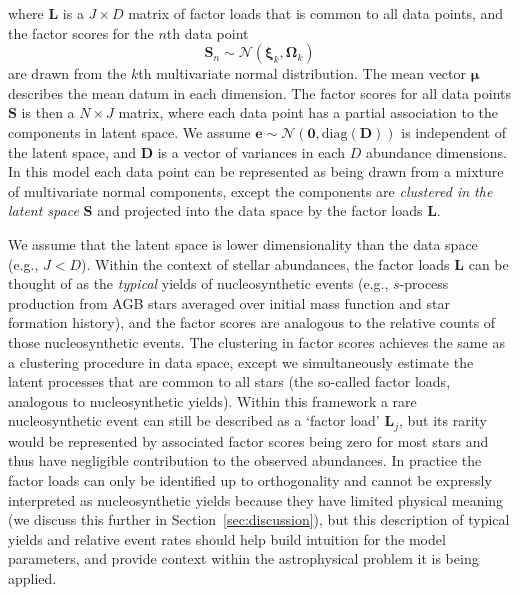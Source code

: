 \documentclass[twocolumn]{aastex62}
\newcommand{\vect}[1]{\boldsymbol{\mathbf{#1}}}
\renewcommand{\vec}[1]{\vect{#1}}
\newcommand{\factorloads}{\textbf{L}}
\newcommand{\factorscores}{\textbf{S}}
\newcommand{\specificvariance}{\vec{D}}
\newcommand{\NumData}{N}
\newcommand{\NumDimensions}{D}
\newcommand{\numdata}{n}
\newcommand{\NumLatentFactors}{J}
\newcommand{\numlatentfactors}{j}
\newcommand{\numcomponents}{k}
\begin{document}
\noindent{}where $\factorloads$ is a $\NumLatentFactors \times \NumDimensions$ 
matrix of factor loads that is common to all data points, and the factor scores 
for the $\numdata$th data point
\begin{equation}
	\factorscores_\numdata \sim \mathcal{N}(\vec\xi_\numcomponents, \vec\Omega_\numcomponents)
\end{equation}
\noindent{}are drawn from the $\numcomponents$th multivariate normal distribution.
The mean vector $\vec\mu$ describes the mean datum in each dimension.
The factor scores for all data points $\factorscores$ is then a 
$\NumData \times \NumLatentFactors$ matrix, where each data point has a partial
association to the components in latent space. 
We assume $\vec{e} \sim \mathcal{N}\left(\vec{0}, \textrm{diag}(\specificvariance)\right)$
is independent of the latent space, and $\specificvariance$ is a
vector of variances in each $\NumDimensions$ abundance dimensions.
In this model each data point can be represented as being drawn
from a mixture of multivariate normal components, except the components
are \emph{clustered in the latent space} $\factorscores$ and projected
into the data space by the factor loads $\factorloads$. 


We assume that the latent space is lower dimensionality than the
data space (e.g., $\NumLatentFactors < \NumDimensions$).
Within the context of stellar abundances, the factor loads
$\factorloads$ can be thought of as the \emph{typical} yields
of nucleosynthetic
events (e.g., $s$-process production from AGB stars averaged over
initial mass function and star formation history), and the
factor scores are analogous to the relative counts of those 
nucleosynthetic events. The clustering in factor scores
achieves the same as a clustering procedure in data space,
except we simultaneously estimate the latent processes that are
common to all stars (the so-called factor loads, analogous to 
nucleosynthetic yields). Within this framework a rare nucleosynthetic event
can still be described as a `factor load' $\factorloads_\numlatentfactors$, 
but its rarity would be represented by associated factor
scores being zero for most stars and thus have negligible contribution
to the observed abundances. In practice the factor loads can only be 
identified up to orthogonality and cannot be expressly interpreted as
nucleosynthetic yields because they have limited physical meaning
(we discuss this further in Section~\ref{sec:discussion}),
but this description of typical yields and relative event rates should
help build intuition for the model parameters, and provide context
within the astrophysical problem it is being applied.
\end{document}
